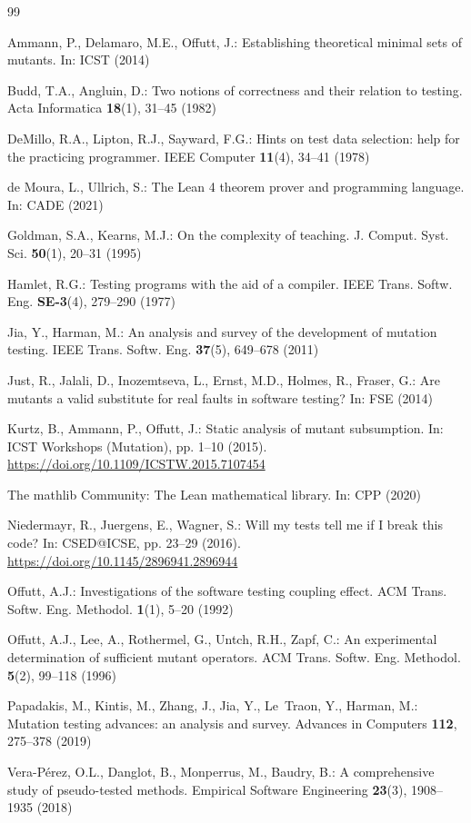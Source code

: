 \documentclass[runningheads,envcountsect,envcountsame]{llncs}
\begin{document}
\begin{thebibliography}{99}

Ammann, P., Delamaro, M.E., Offutt, J.: Establishing theoretical minimal sets of
mutants. In: ICST (2014)

Budd, T.A., Angluin, D.: Two notions of correctness and their relation to
testing. Acta Informatica \textbf{18}(1), 31--45 (1982)

DeMillo, R.A., Lipton, R.J., Sayward, F.G.: Hints on test data selection: help
for the practicing programmer. IEEE Computer \textbf{11}(4), 34--41 (1978)

de Moura, L., Ullrich, S.: The Lean 4 theorem prover and programming language.
In: CADE (2021)

Goldman, S.A., Kearns, M.J.: On the complexity of teaching. J. Comput. Syst. Sci.
\textbf{50}(1), 20--31 (1995)

Hamlet, R.G.: Testing programs with the aid of a compiler. IEEE Trans. Softw.
Eng. \textbf{SE-3}(4), 279--290 (1977)

Jia, Y., Harman, M.: An analysis and survey of the development of mutation
testing. IEEE Trans. Softw. Eng. \textbf{37}(5), 649--678 (2011)

Just, R., Jalali, D., Inozemtseva, L., Ernst, M.D., Holmes, R., Fraser, G.: Are
mutants a valid substitute for real faults in software testing? In: FSE (2014)

Kurtz, B., Ammann, P., Offutt, J.: Static analysis of mutant subsumption. In:
ICST Workshops (Mutation), pp. 1--10 (2015). \url{https://doi.org/10.1109/ICSTW.2015.7107454}

The mathlib Community: The Lean mathematical library. In: CPP (2020)

Niedermayr, R., Juergens, E., Wagner, S.: Will my tests tell me if I break this
code? In: CSED@ICSE, pp. 23--29 (2016). \url{https://doi.org/10.1145/2896941.2896944}

Offutt, A.J.: Investigations of the software testing coupling effect. ACM Trans.
Softw. Eng. Methodol. \textbf{1}(1), 5--20 (1992)

Offutt, A.J., Lee, A., Rothermel, G., Untch, R.H., Zapf, C.: An experimental
determination of sufficient mutant operators. ACM Trans. Softw. Eng. Methodol.
\textbf{5}(2), 99--118 (1996)

Papadakis, M., Kintis, M., Zhang, J., Jia, Y., Le~Traon, Y., Harman, M.:
Mutation testing advances: an analysis and survey. Advances in Computers
\textbf{112}, 275--378 (2019)

Vera-P\'erez, O.L., Danglot, B., Monperrus, M., Baudry, B.: A comprehensive
study of pseudo-tested methods. Empirical Software Engineering \textbf{23}(3),
1908--1935 (2018)

\end{thebibliography}
\end{document}
